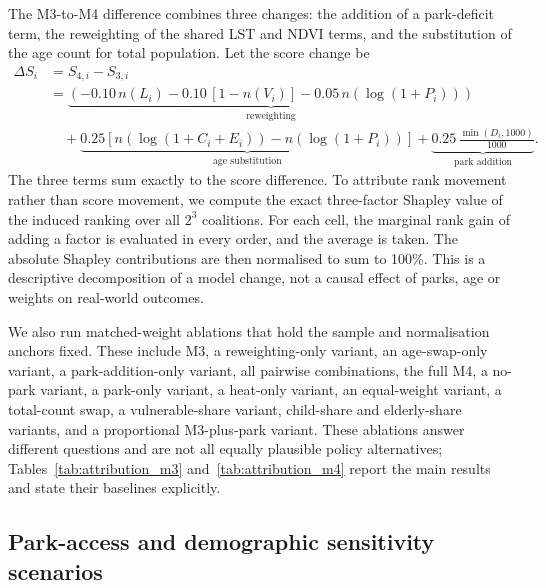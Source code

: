 \documentclass[times,twoside]{_Templates/MultiTargetManuscript}
\begin{document}
The M3-to-M4 difference combines three changes: the addition of a park-deficit
term, the reweighting of the shared LST and NDVI terms, and the substitution of
the age count for total population. Let the score change be
\begin{equation}
\begin{split}
\Delta S_i &= S_{4,i} - S_{3,i} \\
&= \underbrace{\left(-0.10\,n(L_i)-0.10\,[1-n(V_i)]-0.05\,n(\log(1+P_i))\right)}_{\text{reweighting}} \\
&\quad + \underbrace{0.25\left[n(\log(1+C_i+E_i))-n(\log(1+P_i))\right]}_{\text{age substitution}}
+ \underbrace{0.25\,\frac{\min(D_i,1000)}{1000}}_{\text{park addition}}.
\end{split}
\label{eq:delta}
\end{equation}
The three terms sum exactly to the score difference. To attribute rank movement
rather than score movement, we compute the exact three-factor Shapley value of
the induced ranking over all $2^3$ coalitions. For each cell, the marginal rank
gain of adding a factor is evaluated in every order, and the average is taken.
The absolute Shapley contributions are then normalised to sum to 100\%. This is
a descriptive decomposition of a model change, not a causal effect of parks,
age or weights on real-world outcomes.

We also run matched-weight ablations that hold the sample and normalisation
anchors fixed. These include M3, a reweighting-only variant, an age-swap-only
variant, a park-addition-only variant, all pairwise combinations, the full M4,
a no-park variant, a park-only variant, a heat-only variant, an equal-weight
variant, a total-count swap, a vulnerable-share variant, child-share and
elderly-share variants, and a proportional M3-plus-park variant. These
ablations answer different questions and are not all equally plausible policy
alternatives; Tables~\ref{tab:attribution_m3} and~\ref{tab:attribution_m4}
report the main results and state their baselines explicitly.

\subsection{Park-access and demographic sensitivity scenarios}
\end{document}
